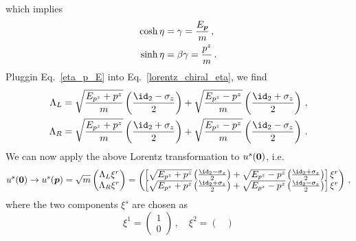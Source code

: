 \begin{sol}
\begin{align}
    \end{align}
    which implies
    \begin{equation}
    \label{eta_p_E}
        \begin{split}
            \cosh \eta &= \gamma = \frac{E_{\boldsymbol{p}}}{m} \,,\\
            \sinh \eta &= \beta \gamma = \frac{p^z}{m}\,.
        \end{split}
    \end{equation}
    Pluggin Eq.~\eqref{eta_p_E} into Eq.~\eqref{lorentz_chiral_eta}, we find
    \begin{equation}
        \begin{split}
            \Lambda_L &= \sqrt{\frac{E_{p^z} + p^z}{m}}\left( \frac{\id_2 - \sigma_z}{2} \right) + \sqrt{\frac{E_{p^z} - p^z}{m}}\left( \frac{\id_2 + \sigma_z}{2} \right)\,,\\
            \Lambda_R &= \sqrt{\frac{E_{p^z} + p^z}{m}}\left( \frac{\id_2 + \sigma_z}{2} \right) + \sqrt{\frac{E_{p^z} - p^z}{m}}\left( \frac{\id_2 - \sigma_z}{2} \right)\,.
        \end{split}
    \end{equation}
    We can now apply the above Lorentz transformation to $u^s(\boldsymbol{0})$, i.e.
    \begin{equation}
    \label{u_boosted}
        u^s(\vzero) \rightarrow u^s(\vp) =
        \sqrt{m}
        \begin{pmatrix}
            \Lambda_L \xi^r \\
            \Lambda_R \xi^r
        \end{pmatrix}
        =
        \begin{pmatrix}
            \left[\sqrt{E_{p^z} + p^z}\left( \frac{\id_2 - \sigma_z}{2} \right) + \sqrt{E_{p^z} - p^z}\left( \frac{\id_2 + \sigma_z}{2} \right) \right]\xi^r \\
            \left[\sqrt{E_{p^z} + p^z}\left( \frac{\id_2 + \sigma_z}{2} \right) + \sqrt{E_{p^z} - p^z}\left( \frac{\id_2 - \sigma_z}{2} \right)\right] \xi^r
        \end{pmatrix}\,,
    \end{equation}
    where the two components $\xi^s$ are chosen as
    \begin{equation}
        \xi^1 =
        \begin{pmatrix}
            1 \\ 0
        \end{pmatrix}\,, \quad
        \xi^2 =
        \begin{pmatrix}

\end{pmatrix}
\end{equation}
\end{sol}
